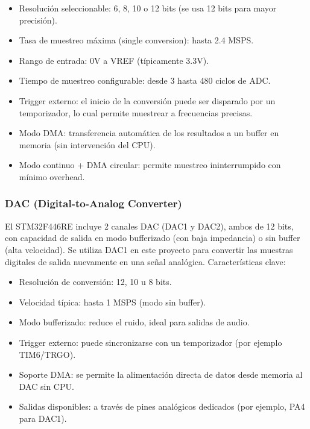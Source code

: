 \documentclass[12pt]{article}
\begin{document}
	\begin{itemize}
		\item Resolución seleccionable: 6, 8, 10 o 12 bits (se usa 12 bits para mayor precisión).
		
		\item Tasa de muestreo máxima (single conversion): hasta 2.4 MSPS.
		
		\item Rango de entrada: 0V a VREF (típicamente 3.3V).
		
		\item Tiempo de muestreo configurable: desde 3 hasta 480 ciclos de ADC.
		
		\item Trigger externo: el inicio de la conversión puede ser disparado por un temporizador, lo cual permite muestrear a frecuencias precisas.
		
		\item Modo DMA: transferencia automática de los resultados a un buffer en memoria (sin intervención del CPU).
		
		\item Modo continuo + DMA circular: permite muestreo ininterrumpido con mínimo overhead.
	\end{itemize}
	
	\subsubsection{DAC (Digital-to-Analog Converter)}
	El STM32F446RE incluye 2 canales DAC (DAC1 y DAC2), ambos de 12 bits, con capacidad de salida en modo bufferizado (con baja impedancia) o sin buffer (alta velocidad). Se utiliza DAC1 en este proyecto para convertir las muestras digitales de salida nuevamente en una señal analógica. Características clave:
	
	\begin{itemize}
		\item Resolución de conversión: 12, 10 u 8 bits.
		
		\item Velocidad típica: hasta 1 MSPS (modo sin buffer).
		
		\item Modo bufferizado: reduce el ruido, ideal para salidas de audio.
		
		\item Trigger externo: puede sincronizarse con un temporizador (por ejemplo TIM6/TRGO).
		
		\item Soporte DMA: se permite la alimentación directa de datos desde memoria al DAC sin CPU.
		
		\item Salidas disponibles: a través de pines analógicos dedicados (por ejemplo, PA4 para DAC1).
	\end{itemize}
	
\end{document}
